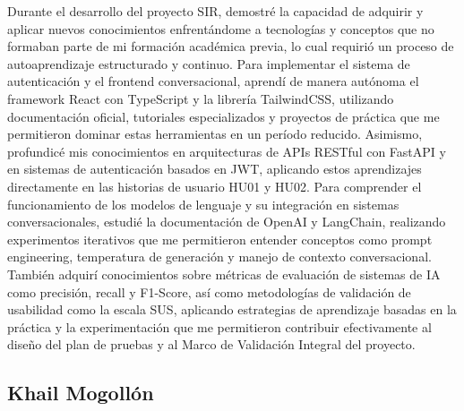 \documentclass[12pt,a4paper,oneside]{report}
\begin{document}
Durante el desarrollo del proyecto SIR, demostré la capacidad de adquirir y aplicar nuevos conocimientos enfrentándome a tecnologías y conceptos que no formaban parte de mi formación académica previa, lo cual requirió un proceso de autoaprendizaje estructurado y continuo. Para implementar el sistema de autenticación y el frontend conversacional, aprendí de manera autónoma el framework React con TypeScript y la librería TailwindCSS, utilizando documentación oficial, tutoriales especializados y proyectos de práctica que me permitieron dominar estas herramientas en un período reducido. Asimismo, profundicé mis conocimientos en arquitecturas de APIs RESTful con FastAPI y en sistemas de autenticación basados en JWT, aplicando estos aprendizajes directamente en las historias de usuario HU01 y HU02. Para comprender el funcionamiento de los modelos de lenguaje y su integración en sistemas conversacionales, estudié la documentación de OpenAI y LangChain, realizando experimentos iterativos que me permitieron entender conceptos como prompt engineering, temperatura de generación y manejo de contexto conversacional. También adquirí conocimientos sobre métricas de evaluación de sistemas de IA como precisión, recall y F1-Score, así como metodologías de validación de usabilidad como la escala SUS, aplicando estrategias de aprendizaje basadas en la práctica y la experimentación que me permitieron contribuir efectivamente al diseño del plan de pruebas y al Marco de Validación Integral del proyecto.

\subsection{Khail Mogollón}\label{subsec:khail-mogollon-2}
\end{document}

